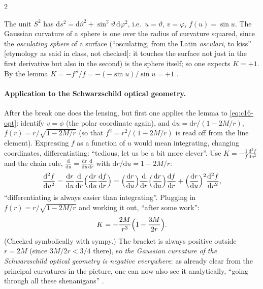 \begin{paracol}{2}
\begin{example}\label{ex:c16-sphere}
The unit $S^2$ has $\mathrm ds^2=\mathrm d\vartheta^2+\sin^2\vartheta\,\mathrm d\varphi^2$, i.e.\ $u=\vartheta$, $v=\varphi$, $f(u)=\sin u$. The Gaussian curvature of a sphere is one over the radius of curvature squared, since the \emph{osculating sphere} of a surface (``osculating, from the Latin \emph{osculari}, to kiss'' [etymology as said in class, not checked]: it touches the surface not just in the first derivative but also in the second) is the sphere itself; so one expects $K=+1$. By the lemma $K=-f''/f=-(-\sin u)/\sin u=+1$ .
\end{example}

\paragraph{Application to the Schwarzschild optical geometry.} After the break one does the lensing, but first one applies the lemma to \eqref{eq:c16-opt}: identify $v=\phi$ (the polar coordinate again), and $\mathrm du=\mathrm dr/(1-2M/r)$, $f(r)=r/\sqrt{1-2M/r}$ (so that $f^2=r^2/(1-2M/r)$ is read off from the line element). Expressing $f$ as a function of $u$ would mean integrating, changing coordinates, differentiating: ``tedious, let us be a bit more clever''. Use $K=-\frac1f\frac{\mathrm d^2f}{\mathrm du^2}$ and the chain rule, $\frac{\mathrm d}{\mathrm du}=\frac{\mathrm dr}{\mathrm du}\frac{\mathrm d}{\mathrm dr}$ with $\mathrm dr/\mathrm du=1-2M/r$:
\[
  \frac{\mathrm d^2f}{\mathrm du^2}=\frac{\mathrm dr}{\mathrm du}\frac{\mathrm d}{\mathrm dr}\Bigl(\frac{\mathrm dr}{\mathrm du}\frac{\mathrm df}{\mathrm dr}\Bigr)=\Bigl(\frac{\mathrm dr}{\mathrm du}\Bigr)\frac{\mathrm d}{\mathrm dr}\Bigl(\frac{\mathrm dr}{\mathrm du}\Bigr)\frac{\mathrm df}{\mathrm dr}+\Bigl(\frac{\mathrm dr}{\mathrm du}\Bigr)^2\frac{\mathrm d^2f}{\mathrm dr^2},
\]
``differentiating is always easier than integrating''. Plugging in $f(r)=r/\sqrt{1-2M/r}$ and working it out, ``after some work'':
\begin{equation}\label{eq:c16-KS}
  K=-\frac{2M}{r^3}\Bigl(1-\frac{3M}{2r}\Bigr).
\end{equation}
(Checked symbolically with sympy.) The bracket is always positive outside $r=2M$ (since $3M/2r<3/4$ there), so \emph{the Gaussian curvature of the Schwarzschild optical geometry is negative everywhere}: as already clear from the principal curvatures in the picture, one can now also see it analytically, ``going through all these shenanigans'' .

\end{paracol}
